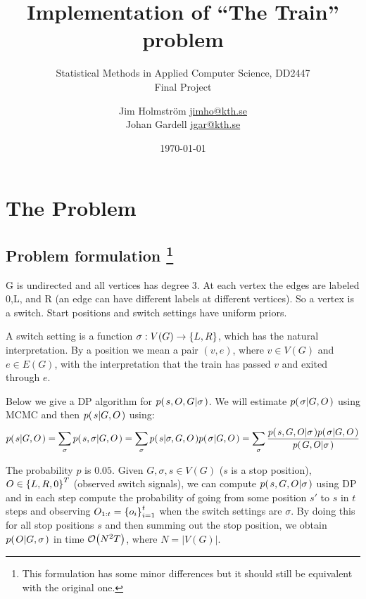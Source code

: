 \documentclass[a4paper,11pt]{kth-mag}
\title{Implementation of ``The Train'' problem}
\subtitle{Statistical Methods in Applied Computer Science, DD2447\\ Final Project}
\author{
    Jim Holmstr\"{o}m \href{mailto:jimho@kth.se}{jimho@kth.se}\\
    Johan Gardell \href{mailto:jgar@kth.se}{jgar@kth.se}
}
\date{\today}
\begin{document}
    \frontmatter
    \pagestyle{empty}
    \removepagenumbers
    \maketitle
    \tableofcontents*
    \mainmatter
    \pagestyle{newchap}

    \chapter{The Problem}
        \section[problemformulation]{
            Problem formulation 
            \footnote{
                This formulation has some minor differences but it should still 
                be equivalent with the original one.
            }
        }
        G is undirected and all vertices has degree 3. At each vertex the edges
        are labeled 0,L, and R (an edge can have different labels at different
        vertices). So a vertex is a switch. Start positions and switch settings
        have uniform priors.

        A switch setting is a function $\sigma: V(G)\rightarrow\left\{{L,R}\right\}$, which
        has the natural interpretation. By a position we mean a pair $(v,e)$,
        where $v\in V(G)$ and $e\in E(G)$, with the interpretation that the
        train has passed $v$ and exited through $e$.

        Below we give a DP algorithm for $p{(\left. s,O,G \middle\vert \sigma \right.)}$. We will
        estimate $p{(\left. \sigma \middle\vert G,O \right.)}$ using MCMC and then $p{(\left. s \middle\vert G,O \right.)}$
        using:
        \begin{equation}
            p{(\left. s \middle\vert G,O \right.)} 
            = \sum\limits_\sigma
                p{(\left. s,\sigma \middle\vert G,O \right.)}
            = \sum\limits_\sigma
                p{(\left. s \middle\vert \sigma,G,O \right.)}p{(\left. \sigma \middle\vert G,O \right.)}
            = \sum\limits_\sigma
                \frac{
                    p{(\left. s,G,O \middle\vert \sigma \right.)}p{(\left. \sigma \middle\vert G,O \right.)}
                }{
                    p{(\left. G,O \middle\vert \sigma \right.)}
                }
        \end{equation}

    The probability $p$ is $0.05$. Given $G,\sigma,s\in V(G)$ ($s$ is a stop
    position), $O\in\left\{{L,R,0}\right\}^T$ (observed switch signals), we can compute 
    $p{(\left. s,G,O \middle\vert \sigma \right.)}$ using DP and in each step compute the probability
    of going from some position $s'$ to $s$ in $t$ steps and observing
    $O_{1:t}=\left\{{o_i}\right\}_{i=1}^t$ when the switch settings are $\sigma$. By doing this
    for all stop positions $s$ and then summing out the stop position, we
    obtain $p{(\left. O \middle\vert G,\sigma \right.)}$ in time $\mathcal{O}{\left(N^2T\right)}$, where $N=|V(G)|$.
\end{document}
